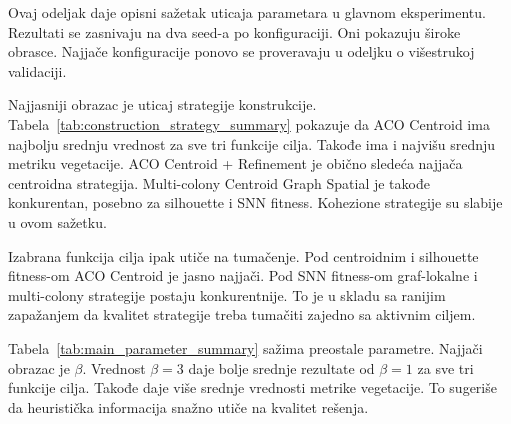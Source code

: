 \documentclass[11pt]{article}
\begin{document}
Ovaj odeljak daje opisni sažetak uticaja parametara u glavnom eksperimentu. Rezultati se zasnivaju na dva seed-a po konfiguraciji. Oni pokazuju široke obrasce. Najjače konfiguracije ponovo se proveravaju u odeljku o višestrukoj validaciji.

Najjasniji obrazac je uticaj strategije konstrukcije. Tabela~\ref{tab:construction_strategy_summary} pokazuje da ACO Centroid ima najbolju srednju vrednost za sve tri funkcije cilja. Takođe ima i najvišu srednju metriku vegetacije. ACO Centroid + Refinement je obično sledeća najjača centroidna strategija. Multi-colony Centroid Graph Spatial je takođe konkurentan, posebno za silhouette i SNN fitness. Kohezione strategije su slabije u ovom sažetku.

Izabrana funkcija cilja ipak utiče na tumačenje. Pod centroidnim i silhouette fitness-om ACO Centroid je jasno najjači. Pod SNN fitness-om graf-lokalne i multi-colony strategije postaju konkurentnije. To je u skladu sa ranijim zapažanjem da kvalitet strategije treba tumačiti zajedno sa aktivnim ciljem.

\begin{table}[ht]
\centering
\caption{Sažetak strategija konstrukcije u glavnom eksperimentu. Fitness vrednosti su odvojene po aktivnom cilju. Metrika vegetacije prosečena je preko svih ciljeva.}
\label{tab:construction_strategy_summary}
\end{table}

Tabela~\ref{tab:main_parameter_summary} sažima preostale parametre. Najjači obrazac je $\beta$. Vrednost $\beta=3$ daje bolje srednje rezultate od $\beta=1$ za sve tri funkcije cilja. Takođe daje više srednje vrednosti metrike vegetacije. To sugeriše da heuristička informacija snažno utiče na kvalitet rešenja.
\end{document}
